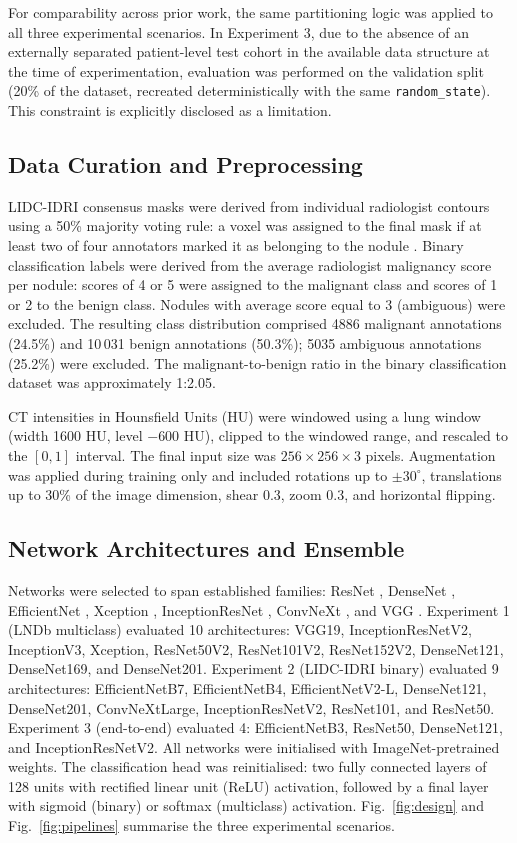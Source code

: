 \documentclass{ieeeaccess}
\begin{document}
For comparability across prior work, the same partitioning logic was applied to all three experimental scenarios. In Experiment 3, due to the absence of an externally separated patient-level test cohort in the available data structure at the time of experimentation, evaluation was performed on the validation split (20\% of the dataset, recreated deterministically with the same \texttt{random\_state}). This constraint is explicitly disclosed as a limitation.

\subsection{Data Curation and Preprocessing}
LIDC-IDRI consensus masks were derived from individual radiologist contours using a 50\% majority voting rule: a voxel was assigned to the final mask if at least two of four annotators marked it as belonging to the nodule \cite{reeves2012}. Binary classification labels were derived from the average radiologist malignancy score per nodule: scores of 4 or 5 were assigned to the malignant class and scores of 1 or 2 to the benign class. Nodules with average score equal to 3 (ambiguous) were excluded. The resulting class distribution comprised 4886 malignant annotations (24.5\%) and 10\,031 benign annotations (50.3\%); 5035 ambiguous annotations (25.2\%) were excluded. The malignant-to-benign ratio in the binary classification dataset was approximately 1:2.05.

CT intensities in Hounsfield Units (HU) were windowed using a lung window (width 1600 HU, level $-600$ HU), clipped to the windowed range, and rescaled to the $[0, 1]$ interval. The final input size was $256 \times 256 \times 3$ pixels. Augmentation was applied during training only and included rotations up to $\pm 30^{\circ}$, translations up to 30\% of the image dimension, shear 0.3, zoom 0.3, and horizontal flipping.

\subsection{Network Architectures and Ensemble}
Networks were selected to span established families: ResNet \cite{he2016}, DenseNet \cite{huang2017}, EfficientNet \cite{tan2019}, Xception \cite{chollet2017}, InceptionResNet \cite{szegedy2017}, ConvNeXt \cite{liu2022}, and VGG \cite{simonyan2015}. Experiment 1 (LNDb multiclass) evaluated 10 architectures: VGG19, InceptionResNetV2, InceptionV3, Xception, ResNet50V2, ResNet101V2, ResNet152V2, DenseNet121, DenseNet169, and DenseNet201. Experiment 2 (LIDC-IDRI binary) evaluated 9 architectures: EfficientNetB7, EfficientNetB4, EfficientNetV2-L, DenseNet121, DenseNet201, ConvNeXtLarge, InceptionResNetV2, ResNet101, and ResNet50. Experiment 3 (end-to-end) evaluated 4: EfficientNetB3, ResNet50, DenseNet121, and InceptionResNetV2. All networks were initialised with ImageNet-pretrained weights. The classification head was reinitialised: two fully connected layers of 128 units with rectified linear unit (ReLU) activation, followed by a final layer with sigmoid (binary) or softmax (multiclass) activation. Fig.~\ref{fig:design} and Fig.~\ref{fig:pipelines} summarise the three experimental scenarios.
\end{document}
